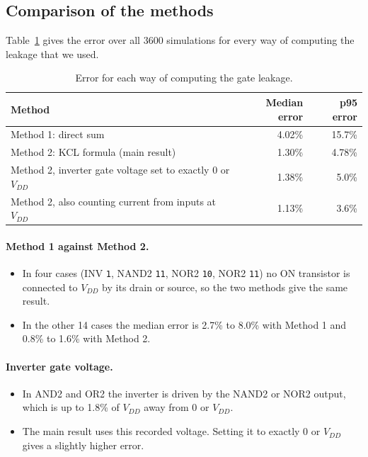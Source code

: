 \documentclass{article}
\begin{document}
\subsection{Comparison of the methods}

Table~\ref{tab:variants} gives the error over all 3600 simulations for every
way of computing the leakage that we used.

\begin{table}[H]
\centering
\begin{tabular}{|l|r|r|}
\hline
Method & Median error & p95 error \\
\hline
Method 1: direct sum & 4.02\% & 15.7\% \\
Method 2: KCL formula (main result) & 1.30\% & 4.78\% \\
Method 2, inverter gate voltage set to exactly 0 or $V_{DD}$ & 1.38\% & 5.0\% \\
Method 2, also counting current from inputs at $V_{DD}$ & 1.13\% & 3.6\% \\
\hline
\end{tabular}
\caption{Error for each way of computing the gate leakage.}
\label{tab:variants}
\end{table}

\paragraph{Method 1 against Method 2.}
\begin{itemize}
    \item In four cases (INV \texttt{1}, NAND2 \texttt{11}, NOR2 \texttt{10},
          NOR2 \texttt{11}) no ON transistor is connected to $V_{DD}$ by its
          drain or source, so the two methods give the same result.
    \item In the other 14 cases the median error is 2.7\% to 8.0\% with
          Method 1 and 0.8\% to 1.6\% with Method 2.
\end{itemize}

\paragraph{Inverter gate voltage.}
\begin{itemize}
    \item In AND2 and OR2 the inverter is driven by the NAND2 or NOR2
          output, which is up to 1.8\% of $V_{DD}$ away from 0 or $V_{DD}$.
    \item The main result uses this recorded voltage. Setting it to exactly
          0 or $V_{DD}$ gives a slightly higher error.
\end{itemize}
\end{document}
